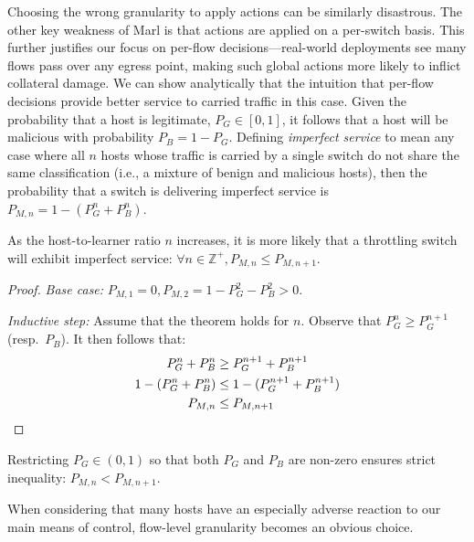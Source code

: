 Choosing the wrong granularity to apply actions can be similarly disastrous.
The other key weakness of Marl is that actions are applied on a per-switch basis.
This further justifies our focus on per-flow decisions---real-world deployments see many flows pass over any egress point, making such global actions more likely to inflict collateral damage.
We can show analytically that the intuition that per-flow decisions provide better service to carried traffic in this case.
Given the probability that a host is legitimate, $P_G \in [0,1]$, it follows that a host will be malicious with probability $P_B = 1 - P_G$.
Defining \emph{imperfect service} to mean any case where all $n$ hosts whose traffic is carried by a single switch do not share the same classification (i.e., a mixture of benign and malicious hosts), then the probability that a switch is delivering imperfect service is $P_{M,n} = 1 - (P_G^n + P_B^n)$.
\begin{thm}
	As the host-to-learner ratio $n$ increases, it is more likely that a throttling switch will exhibit imperfect service: $\forall n \in \mathbb{Z}^{+}, P_{M,n} \le P_{M,n+1}$.
\end{thm}
\begin{proof}
	\emph{Base case:} $P_{M,1}=0, P_{M,2} = 1 - P_G^2 - P_B^2 > 0$.
	
	\emph{Inductive step:} Assume that the theorem holds for $n$. Observe that $P_G^n \ge P_G^{n+1}$ (resp.\ $P_B$). It then follows that:
	\begin{align*}
	P_G^n + P_B^n &\ge P_G^{n+1} + P_B^{n+1}\\
	1 - (P_G^n + P_B^n) &\le 1 - (P_G^{n+1} + P_B^{n+1})\\
	P_{M,n} &\le P_{M,n+1} \qedhere
	\end{align*}
\end{proof}
\begin{corr}
	Restricting $P_G \in (0,1)$ so that both $P_G$ and $P_B$ are non-zero ensures strict inequality: $P_{M,n} < P_{M,n+1}$.
\end{corr}
When considering that many hosts have an especially adverse reaction to our main means of control, flow-level granularity becomes an obvious choice.

